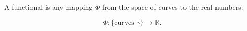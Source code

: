 A functional is any mapping $\Phi$ from the space of curves to the real numbers:

$$\Phi \colon \{\text{curves } \gamma\} \longrightarrow \mathbb{R}.$$
